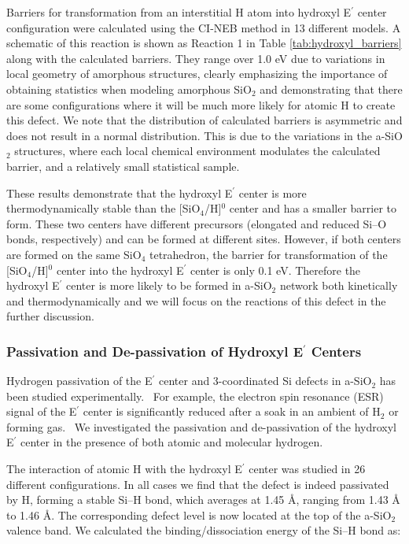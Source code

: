 \documentclass[aps,prb,reprint,superscriptaddress,showpacs]{revtex4-1}
\begin{document}
Barriers for transformation from an interstitial H atom into hydroxyl E$^\prime$ center configuration were calculated using the CI-NEB method in 13 different models. A schematic of this reaction is shown as Reaction 1 in Table \ref{tab:hydroxyl_barriers} along with the calculated barriers. They range over 1.0 eV due to variations in local geometry of amorphous structures, clearly emphasizing the importance of obtaining statistics when modeling amorphous SiO$_2$ and demonstrating that there are some configurations where it will be much more likely for atomic H to create this defect. We note that the distribution of calculated barriers is asymmetric and does not result in a normal distribution. This is due to the variations in the a-SiO$_2$ structures, where each local chemical environment modulates the calculated barrier, and a relatively small statistical sample.

These results demonstrate that the hydroxyl E$^\prime$ center is more thermodynamically stable than the [SiO$_4$/H]$^0$ center and has a smaller barrier to form. These two centers have different precursors (elongated and reduced \mbox{Si--O} bonds, respectively) and can be formed at different sites. However, if both centers are formed on the same SiO$_4$ tetrahedron, the barrier for transformation of the [SiO$_4$/H]$^0$ center into the hydroxyl E$^\prime$ center is only 0.1 eV.  Therefore the hydroxyl E$^\prime$ center is more likely to be formed in a-SiO$_2$ network both kinetically and thermodynamically and we will focus on the reactions of this defect in the further discussion. 

\subsubsection{Passivation and De-passivation of Hydroxyl E$^\prime$ Centers}

Hydrogen passivation of the E$^\prime$ center and 3-coordinated Si defects in a-SiO$_2$ has been studied experimentally.~\cite{fleetwood_h_device} For example, the electron spin resonance (ESR) signal of the E$^\prime$ center is significantly reduced after a soak in an ambient of H$_2$ or forming gas.~\cite{h2crack_li} We investigated the passivation and de-passivation of the hydroxyl E$^\prime$ center in the presence of both atomic and molecular hydrogen. 

The interaction of atomic H with the hydroxyl E$^\prime$ center was studied in 26 different configurations. In all cases we find that the defect is indeed passivated by H, forming a stable \mbox{Si--H} bond, which averages at 1.45 {\AA}, ranging from 1.43 {\AA} to 1.46 {\AA}. The corresponding defect level is now located at the top of the a-SiO$_2$ valence band. We calculated the binding/dissociation energy of the \mbox{Si--H} bond as:
\end{document}
